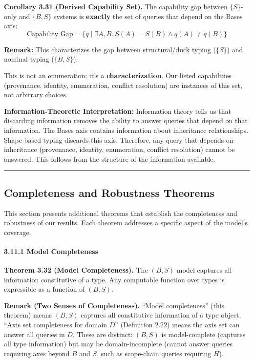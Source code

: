 \textbf{Corollary 3.31 (Derived Capability Set).} The capability gap
between $\{S\}$-only and $\{B,S\}$ systems is \textbf{exactly} the set of
queries that depend on the Bases axis:
\[\text{Capability Gap} = \{ q \mid \exists A, B.\ S(A) = S(B) \land q(A) \neq q(B) \}\]

\textbf{Remark:} This characterizes the gap between structural/duck typing ($\{S\}$) and nominal typing ($\{B,S\}$).

This is not an enumeration; it's a \textbf{characterization}. Our
listed capabilities (provenance, identity, enumeration, conflict
resolution) are instances of this set, not arbitrary choices.

\textbf{Information-Theoretic Interpretation:} Information theory tells
us that discarding information removes the ability to answer queries that depend on that
information. The Bases axis contains information about inheritance
relationships. Shape-based typing discards this axis. Therefore, any
query that depends on inheritance (provenance, identity, enumeration,
conflict resolution) cannot be answered. This follows from the structure
of the information available.

\begin{center}\rule{0.5\linewidth}{0.5pt}\end{center}

\subsection{Completeness and Robustness Theorems}\label{completeness-robustness-theorems}

This section presents additional theorems that establish the completeness
and robustness of our results. Each theorem addresses a specific aspect
of the model's coverage.

\paragraph{3.11.1 Model Completeness}\label{model-completeness}

\textbf{Theorem 3.32 (Model Completeness).}\label{thm:model-completeness}
The \((B, S)\) model
captures all information constitutive of a type. Any computable function
over types is expressible as a function of \((B, S)\).

\textbf{Remark (Two Senses of Completeness).} ``Model completeness'' (this theorem) means \((B, S)\) captures all constitutive information of a type object. ``Axis set completeness for domain \(D\)'' (Definition 2.22) means the axis set can answer all queries in \(D\). These are distinct: \((B, S)\) is model-complete (captures all type information) but may be domain-incomplete (cannot answer queries requiring axes beyond \(B\) and \(S\), such as scope-chain queries requiring \(H\)).

